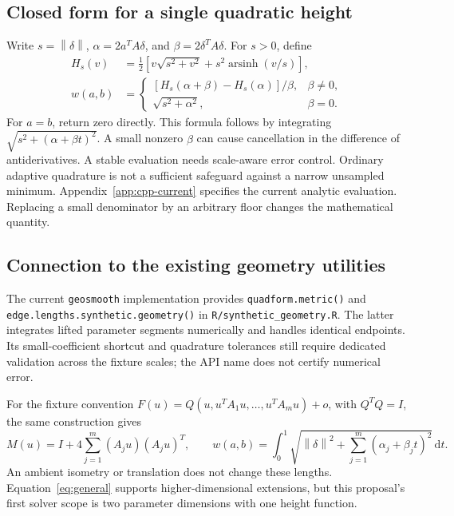 \documentclass[11pt,letterpaper]{article}
\newcommand{\norm}[1]{\left\lVert#1\right\rVert}
\newcommand{\dd}{\,\mathrm{d}}
\newcommand{\src}[1]{\nolinkurl{#1}}
\begin{document}
\subsection{Closed form for a single quadratic height}
Write $s=\norm{\delta}$, $\alpha=2a^TA\delta$, and $\beta=2\delta^TA\delta$. For $s>0$, define
\begin{align}
 H_s(v)&=\tfrac12\left[v\sqrt{s^2+v^2}+s^2\operatorname{arsinh}(v/s)\right],\\
 w(a,b)&=\begin{cases}
 [H_s(\alpha+\beta)-H_s(\alpha)]/\beta,&\beta\ne0,\\
 \sqrt{s^2+\alpha^2},&\beta=0.
 \end{cases}\label{eq:closed}
\end{align}
For $a=b$, return zero directly. This formula follows by integrating $\sqrt{s^2+(\alpha+\beta t)^2}$. A small nonzero $\beta$ can cause cancellation in the difference of antiderivatives. A stable evaluation needs scale-aware error control. Ordinary adaptive quadrature is not a sufficient safeguard against a narrow unsampled minimum. Appendix~\ref{app:cpp-current} specifies the current analytic evaluation. Replacing a small denominator by an arbitrary floor changes the mathematical quantity.

\subsection{Connection to the existing geometry utilities}
The current \src{geosmooth} implementation provides \src{quadform.metric()} and \src{edge.lengths.synthetic.geometry()} in \src{R/synthetic_geometry.R}. The latter integrates lifted parameter segments numerically and handles identical endpoints. Its small-coefficient shortcut and quadrature tolerances still require dedicated validation across the fixture scales; the API name does not certify numerical error.

For the fixture convention $F(u)=Q(u,u^TA_1u,\ldots,u^TA_mu)+o$, with $Q^TQ=I$, the same construction gives
\begin{equation}\label{eq:general}
 M(u)=I+4\sum_{j=1}^m(A_ju)(A_ju)^T,\qquad
 w(a,b)=\int_0^1\sqrt{\norm{\delta}^2+\sum_{j=1}^m(\alpha_j+\beta_jt)^2}\dd t.
\end{equation}
An ambient isometry or translation does not change these lengths. Equation~\eqref{eq:general} supports higher-dimensional extensions, but this proposal's first solver scope is two parameter dimensions with one height function.
\end{document}
